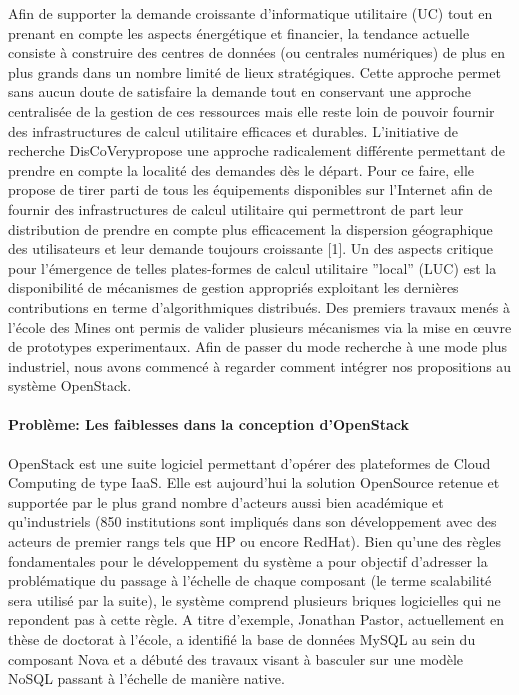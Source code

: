 \documentclass[a4paper,11pt]{article}
\newcommand{\discovery}{DisCoVery}
\begin{document}
\begin{note}
 Afin de supporter la demande croissante d'informatique utilitaire (UC) tout en prenant en compte les aspects énergétique et financier, la tendance actuelle consiste à construire des centres de données (ou centrales numériques) de plus en plus grands dans un nombre limité de lieux stratégiques. Cette approche permet sans aucun doute de satisfaire la demande tout en conservant une approche centralisée de la gestion de ces ressources mais elle reste loin de pouvoir fournir des infrastructures de calcul utilitaire efficaces et durables.
   L'initiative de recherche \discovery propose une approche radicalement différente permettant de prendre en compte la localité des demandes dès le départ.
Pour ce faire, elle propose de tirer parti de tous les équipements
disponibles sur l'Internet afin de fournir des infrastructures de calcul
utilitaire  qui permettront de part leur distribution de prendre en compte plus
efficacement la dispersion géographique des utilisateurs et leur demande
toujours croissante [1]. Un des aspects critique pour l'émergence de telles
plates-formes de calcul utilitaire ''local'' (LUC) est la disponibilité de
mécanismes de gestion appropriés exploitant les dernières
contributions en terme d'algorithmiques distribués.
Des premiers travaux menés à l'école des Mines ont permis de valider
plusieurs mécanismes via la mise en \oe uvre de prototypes
experimentaux.
Afin de passer du mode recherche à une mode plus industriel, nous
avons commencé à regarder comment intégrer nos propositions au système
OpenStack.

\paragraph*{Problème: Les faiblesses dans la conception d'OpenStack\\}

  OpenStack est une suite logiciel permettant d'opérer des plateformes
  de Cloud Computing de type IaaS. Elle est aujourd'hui la solution
  OpenSource retenue et supportée par le plus grand nombre d'acteurs
  aussi bien académique et qu'industriels (850 institutions sont
  impliqués dans son développement avec des acteurs de premier rangs
  tels que HP ou encore RedHat).
  Bien qu'une des règles fondamentales pour le développement du
  système a pour objectif d'adresser la problématique du passage à
  l'échelle de chaque composant (le terme scalabilité sera utilisé par
  la suite), le système comprend plusieurs briques
  logicielles qui ne repondent pas à
  cette règle. A titre d'exemple, Jonathan Pastor, actuellement en
  thèse de doctorat à l'école, a identifié la base de données MySQL au
  sein du composant Nova et a débuté des travaux visant à basculer sur
  une modèle NoSQL passant à l'échelle de manière native.



\end{note}
\end{document}

